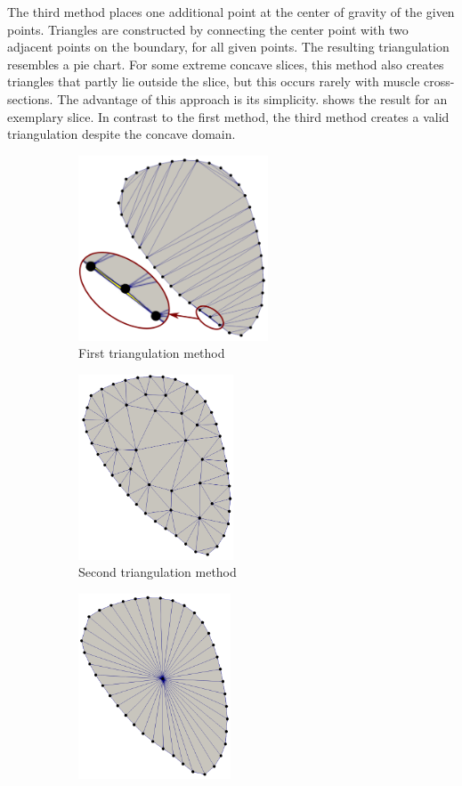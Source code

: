 The third method places one additional point at the center of gravity of the given points. Triangles are constructed by connecting the center point with two adjacent points on the boundary, for all given points. The resulting triangulation resembles a pie chart. For some extreme concave slices, this method also creates triangles that partly lie outside the slice, but this occurs rarely with muscle cross-sections. The advantage of this approach is its simplicity.
 shows the result for an exemplary slice. In contrast to the first method, the third method creates a valid triangulation despite the concave domain.

\begin{figure}%
  \centering%
  \begin{subfigure}[t]{0.31\textwidth}%
    \centering%
    \includegraphics[height=55mm]{images/fiber_creation/triangulation_0.pdf}%
    \caption{First triangulation method}%
    \label{fig:triangulation_0}%
  \end{subfigure}
  \qquad
  \begin{subfigure}[t]{0.27\textwidth}%
    \centering%
    \includegraphics[height=55mm]{images/fiber_creation/triangulation_1.png}%
    \caption{Second trian\-gulation method}%
    \label{fig:triangulation_1}%
  \end{subfigure}
  \quad
  \begin{subfigure}[t]{0.32\textwidth}%
    \centering%
    \includegraphics[height=55mm]{images/fiber_creation/triangulation_2.png}%

\end{subfigure}
\end{figure}

